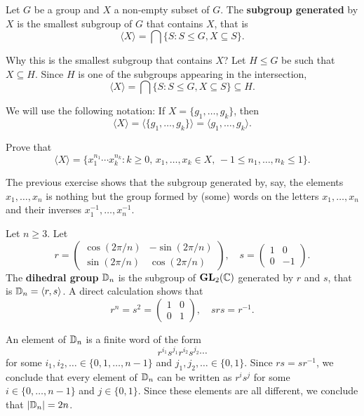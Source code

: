 \begin{definition}
        Let $G$ be a group and $X$ a non-empty 
        subset of $G$. The \textbf{subgroup
        generated} by $X$ is the smallest subgroup of $G$ that contains
        $X$, that is 
        \[
            \langle X\rangle=\bigcap\{S:S\leq G,X\subseteq S\}.
        \]
\end{definition}

Why this is the smallest subgroup that contains $X$? 
Let $H\leq G$ be such that 
$X\subseteq H$. Since $H$ is one of the subgroups appearing
in the intersection, 
\[
        \langle X\rangle=\bigcap\{S:S\leq G,X\subseteq S\}\subseteq H.        
\]

We will use the following notation:
If $X=\{g_1,\dots,g_k\}$, then 
\[
\langle
X\rangle=\langle\{g_1,\dots,g_k\}\rangle=\langle g_1,\dots,g_k\rangle.
\]

\begin{exercise}
\label{xca:generated}
Prove that 
\[
    \langle X\rangle=\{x_1^{n_1}\cdots x_k^{n_k}:k\geq0,\,x_1,\dots,x_k\in X,\,-1\leq n_1,\dots,n_k\leq 1\}.
\]
\end{exercise}

The previous exercise shows that
the subgroup generated by, say, the elements 
$x_1,\dots,x_n$ is nothing but the 
group formed by (some) words on the letters 
$x_1,\dots,x_n$ and their inverses 
$x_1^{-1},\dots,x_n^{-1}$. 

\begin{example}
Let $n\geq3$. Let 
\[
r=\begin{pmatrix}
\cos(2\pi/n) & -\sin(2\pi/n)\\
\sin(2\pi/n) & \cos(2\pi/n)
\end{pmatrix},
\quad
s=\begin{pmatrix}
        1 & 0\\
        0 & -1
\end{pmatrix}.
\]
The \textbf{dihedral group} $\mathbb{D}_n$ is the subgroup of
$\mathbf{GL}_2(\mathbb{C})$ generated by $r$ and $s$,
that is $\mathbb{D}_n=\langle r,s\rangle$. A direct calculation shows that 
\[
r^n=s^2=\begin{pmatrix}
        1&0\\
        0&1
\end{pmatrix},
\quad
srs=r^{-1}.
\]

An element of $\mathbb{D}_n$ is a finite word of the form 
\[
r^{i_1}s^{j_1}r^{i_2}s^{j_2}\cdots
\]
for some 
 $i_1,i_2,\dots\in\{0,1,\dots,n-1\}$ and 
$j_1,j_2,\dots\in\{0,1\}$. Since $rs=sr^{-1}$, we conclude that
every element of $\mathbb{D}_n$ can be written as $r^is^j$ 
for some $i\in\{0,\dots,n-1\}$ and $j\in\{0,1\}$. Since these elements are all different, we conclude that 
$|\mathbb{D}_n|=2n$.
\end{example}

